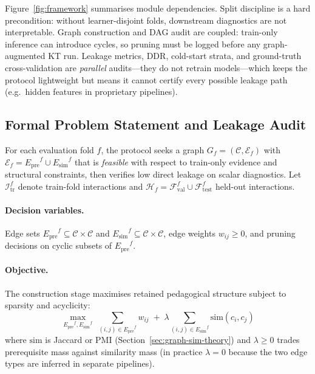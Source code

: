 \documentclass[runningheads]{llncs}
\newcommand{\Epre}{\ensuremath{E_{\text{pre}}}}
\newcommand{\Esim}{\ensuremath{E_{\text{sim}}}}
\newcommand{\DDR}{\textsc{DDR}}
\begin{document}
Figure~\ref{fig:framework} summarises module dependencies. Split
discipline is a hard precondition: without learner-disjoint folds,
downstream diagnostics are not interpretable. Graph construction and DAG
audit are coupled: train-only inference can introduce cycles, so pruning
must be logged before any graph-augmented KT run. Leakage metrics,
\DDR{}, cold-start strata, and ground-truth cross-validation are
\emph{parallel} audits---they do not retrain models---which keeps the
protocol lightweight but means it cannot certify every possible leakage
path (e.g.\ hidden features in proprietary pipelines).

\subsection{Formal Problem Statement and Leakage Audit}
\label{sec:formal-problem}
For each evaluation fold $f$, the protocol seeks a graph
$G_f=(\mathcal{C},\mathcal{E}_f)$ with $\mathcal{E}_f=\Epre^f\cup\Esim^f$
that is \emph{feasible} with respect to train-only evidence and
structural constraints, then verifies low direct leakage on scalar
diagnostics. Let $\mathcal{I}_{\text{tr}}^f$ denote train-fold
interactions and $\mathcal{H}_f=\mathcal{F}_{\text{val}}^f\cup
\mathcal{F}_{\text{test}}^f$ held-out interactions.

\paragraph{Decision variables.}
Edge sets $\Epre^f\subseteq\mathcal{C}\times\mathcal{C}$ and
$\Esim^f\subseteq\mathcal{C}\times\mathcal{C}$, edge weights
$w_{ij}\ge 0$, and pruning decisions on cyclic subsets of $\Epre^f$.

\paragraph{Objective.}
The construction stage maximises retained pedagogical structure subject
to sparsity and acyclicity:
\begin{equation}
\max_{\Epre^f,\Esim^f}\;
\sum_{(i,j)\in\Epre^f} w_{ij}
\;+\;
\lambda \sum_{(i,j)\in\Esim^f} \mathrm{sim}(c_i,c_j)
\label{eq:graph-objective}
\end{equation}
where $\mathrm{sim}$ is Jaccard or PMI (Section~\ref{sec:graph-sim-theory})
and $\lambda\ge 0$ trades prerequisite mass against similarity mass (in
practice $\lambda{=}0$ because the two edge types are inferred in
separate pipelines).
\end{document}
